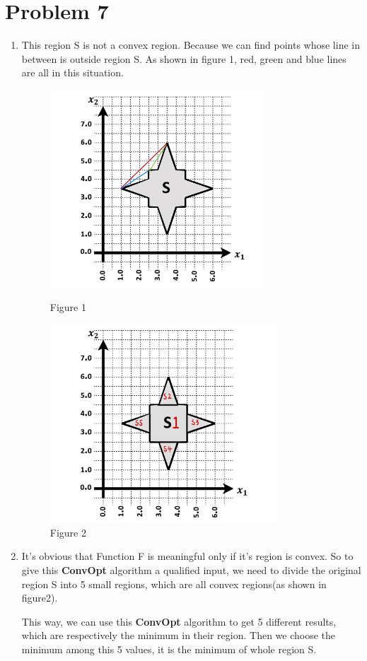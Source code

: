 \documentclass[12pt]{scrartcl}
\begin{document}
    \section*{Problem 7}
\begin{enumerate}[label=\alph*)]
\item
This region S is not a convex region. Because we can find points whose line in between is outside region S. As shown in figure 1, red, green and blue lines are all in this situation.

\begin{figure}[htbp]
\centering
\begin{minipage}[t]{0.48\textwidth}
\centering
\includegraphics[width=8cm]{Prob7.1.JPG}
\caption{Figure 1}
\end{minipage}
\begin{minipage}[t]{0.48\textwidth}
\centering
\includegraphics[width=8.5cm]{Prob7.2.png}
\caption{Figure 2}
\end{minipage}
\end{figure}

\item
It's obvious that Function F is meaningful only if it's region is convex. So to give this \textbf{ConvOpt} algorithm a qualified input, we need to divide the original region S into 5 small regions, which are all convex regions(as shown in figure2).


This way, we can use this \textbf{ConvOpt} algorithm to get 5 different results, which are respectively the minimum in their region. Then we choose the minimum among this 5 values, it is the minimum of whole region S.

\end{enumerate}
\end{document}
